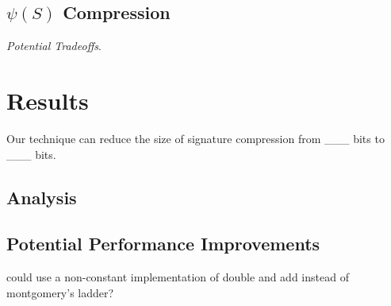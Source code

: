 \subsection{$\psi(S)$ Compression}

\noindent
\textit{Potential Tradeoffs}.

\section{Results}

Our technique can reduce the size of \sidh signature compression from \_\_\_ bits to \_\_\_ bits.

\subsection{Analysis}

\subsection{Potential Performance Improvements}

could use a non-constant implementation of double and add instead of montgomery's ladder? 

